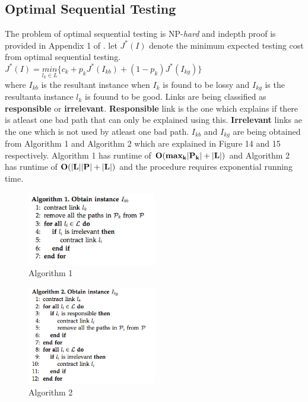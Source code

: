 \documentclass[10pt]{sigplan-proc-varsize}
\begin{document}
\subsection{Optimal Sequential Testing}
The problem of optimal sequential testing is NP-{\it hard} and indepth proof is provided in Appendix 1 of \cite{krishna:12}. let $J^*(I)$ denote the minimum expected testing cost from optimal sequential testing. \\
$J^*(I) = \underset{l_k \in L}{min}\{c_k+p_kJ^*(I_{kb})+(1-p_k)J^*(I_{kg})\}$ \\
where $I_{kb}$ is the resultant instance when $I_{k}$ is found to be lossy and $I_{kg}$ is the resultanta instance $l_{k}$ is fouund to be good. Links are being classified as {\bf responsible } or {\bf irrelevant}. {\bf Responsible} link is the one which explains if there is atleast one bad path that can only be explained using this.  {\bf Irrelevant} links ae the one which is not used by atleast one bad path. $I_{kb}$ and $I_{kg}$ are being obtained from Algorithm 1 and Algorithm 2 which are explained in Figure 14 and 15 respectively. Algorithm 1 has runtime of ${\bf O(max_k|P_k|+|L|)}$ and Algorithm 2 has runtime of ${\bf O(|L||P|+|L|)}$ and the procedure requires exponential running time.

\begin{figure}[h!]
  \caption{Algorithm 1}
  \centering
    \includegraphics[width=0.5\textwidth]{Fig16}
\end{figure}

\begin{figure}[h!]
  \caption{Algorithm 2}
  \centering
    \includegraphics[width=0.5\textwidth]{Fig17}
\end{figure}
\end{document}
